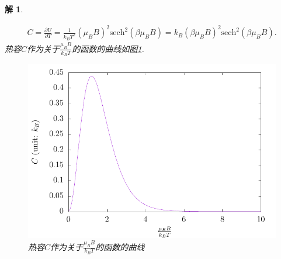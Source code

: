 \documentclass[UTF8,10pt,a4paper]{article}
\theoremstyle{Problem}
\theoremstyle{Solution}
\newtheorem*{sol}{解}
\begin{document}
\begin{sol}
\begin{enumerate}
\begin{align}
            C=\frac{\partial U}{\partial T}=\frac{1}{k_BT^2}(\mu_BB)^2\text{sech}^2(\beta\mu_BB)=k_B(\beta\mu_BB)^2\text{sech}^2(\beta\mu_BB).
        \end{align}
        热容$C$作为关于$\frac{\mu_BB}{k_BT}$的函数的曲线如图\ref{3-C}.
        \begin{figure}[h]
            \centering
            \includegraphics[width=.5\textwidth]{3-C.pdf}
            \caption{热容$C$作为关于$\frac{\mu_BB}{k_BT}$的函数的曲线}
            \label{3-C}
        \end{figure}
    \end{enumerate}
\end{sol}
\end{document}
